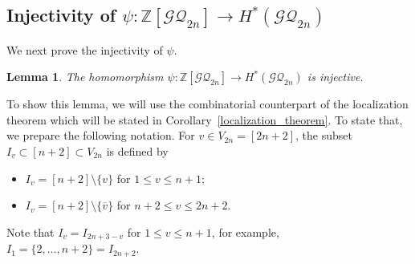 \documentclass[12pt]{amsart}
\newtheorem{lemma}[theorem]{Lemma}
\theoremstyle{remark}
\numberwithin{equation}{section}
\begin{document}
\subsection{Injectivity of $\psi:\mathbb{Z}[\mathcal{GQ}_{2n}]\to H^{*}(\mathcal{GQ}_{2n})$}
\label{sect:5.2}

We next prove the injectivity of $\psi$.
\begin{lemma}
\label{injectivity}
The homomorphism 
$\psi:\mathbb{Z}[\mathcal{GQ}_{2n}]\to H^{*}(\mathcal{GQ}_{2n})$
is injective.
\end{lemma}

To show this lemma, we will use the combinatorial counterpart of the localization theorem which will be stated in Corollary~\ref{localization_theorem}.
To state that, we prepare the following notation.
For $v\in V_{2n}=[2n+2]$, the subset $I_{v}\subset [n+2]\subset V_{2n}$ is defined by 
\begin{itemize}
\item $I_{v}=[n+2]\setminus \{v\}$ for $1\le v\le n+1$;
\item $I_{v}=[n+2]\setminus \{\overline{v}\}$ for $n+2\le v\le 2n+2$.
\end{itemize} 
Note that $I_{v}=I_{2n+3-v}$ for $1\le v\le n+1$, for example, $I_{1}=\{2,\ldots, n+2\}=I_{2n+2}$.
\end{document}
